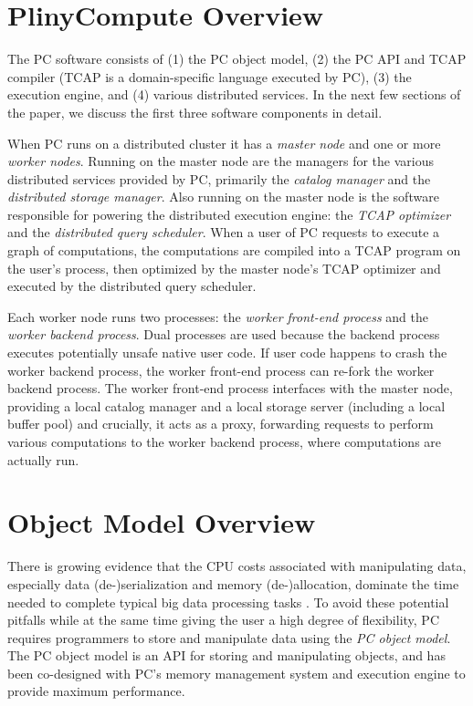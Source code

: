 
\section{PlinyCompute Overview}

The PC software consists of 
(1) the PC object model, (2) the PC API and TCAP compiler (TCAP is a domain-specific language executed by PC),
(3) the execution engine, and (4) various distributed services.  In the next few sections of the paper, 
we discuss the first three software components in detail.

When PC runs on a distributed cluster it has a \emph{master node} and one or more \emph{worker nodes}.
Running on the master node are the managers for the various distributed services provided by PC, primarily 
the \emph{catalog manager} and the \emph{distributed storage manager}.  Also running on the master
node is the software responsible for powering the distributed execution engine: the \emph{TCAP optimizer} and
the \emph{distributed query scheduler}.  
When a user of PC requests to execute a graph of computations, the
computations are compiled into a TCAP program on the user's process, then optimized
by the master node's TCAP optimizer and executed by the distributed query scheduler.

Each worker node runs two processes: the \emph{worker front-end process} and the \emph{worker backend process}.
Dual processes are used because the backend process
executes potentially unsafe native user code.
If
user code happens to crash the worker backend process, the worker 
front-end process can re-fork the worker
backend process.  
The worker front-end process interfaces with the master node, providing a local catalog manager and a local storage server (including
a local buffer pool)
and crucially, it acts as a proxy, forwarding requests to perform various computations to the worker backend process, where
computations are actually run.

\section{Object Model Overview}

There is growing evidence that the CPU costs associated with manipulating data, especially data (de-)serialization and memory 
(de-)allocation,  
dominate the time needed to complete typical big data processing tasks
\cite{ousterhout2015making, shi2015clash, SikdarSoCC2017}.
To avoid these potential pitfalls while at the same time giving the user a high degree of flexibility,
PC requires programmers to store and manipulate data using the \emph{PC object model}.
The PC object model is an API for storing and manipulating objects, and has been co-designed with PC's memory management system and execution engine to provide
maximum performance.  

